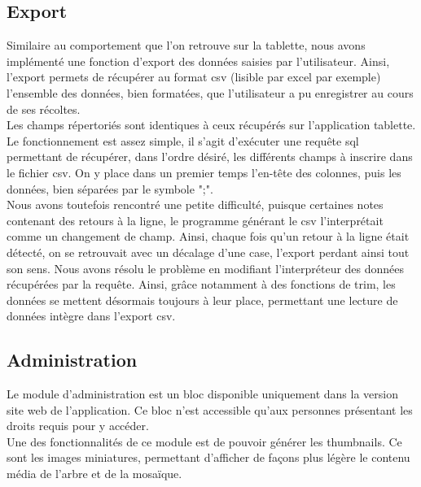 \documentclass[twoside]{EPURapport}
\begin{document}
		\subsection{Export}
		
	Similaire au comportement que l'on retrouve sur la tablette, nous avons implémenté une fonction d'export des données saisies par l'utilisateur. Ainsi, l'export permets de récupérer au format csv (lisible par excel par exemple) l'ensemble des données, bien formatées, que l'utilisateur a pu enregistrer au cours de ses récoltes.\\
	
	Les champs répertoriés sont identiques à ceux récupérés sur l'application tablette.\\
	
	Le fonctionnement est assez simple, il s'agit d'exécuter une requête sql permettant de récupérer, dans l'ordre désiré, les différents champs à inscrire dans le fichier csv. On y place dans un premier temps l'en-tête des colonnes, puis les données, bien séparées par le symbole ";".\\
	
	Nous avons toutefois rencontré une petite difficulté, puisque certaines notes contenant des retours à la ligne, le programme générant le csv l'interprétait comme un changement de champ. Ainsi, chaque fois qu'un retour à la ligne était détecté, on se retrouvait avec un décalage d'une case, l'export perdant ainsi tout son sens. Nous avons résolu le problème en modifiant l'interpréteur des données récupérées par la requête. Ainsi, grâce notamment à des fonctions de trim, les données se mettent désormais toujours à leur place, permettant une lecture de données intègre dans l'export csv.	
		
		
		\subsection{Administration}
		
	Le module d'administration est un bloc disponible uniquement dans la version site web de l'application. Ce bloc n'est accessible qu'aux personnes présentant les droits requis pour y accéder.\\
	
	Une des fonctionnalités de ce module est de pouvoir générer les thumbnails. Ce sont les images miniatures, permettant d'afficher de façons plus légère le contenu média de l'arbre et de la mosaïque.\\
	
\end{document}
